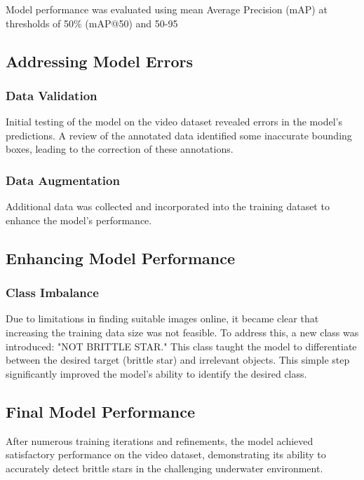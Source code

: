\documentclass{article}
\begin{document}
Model performance was evaluated using mean Average Precision (mAP) at thresholds of 50\% (mAP@50) and 50-95%

\subsection{Addressing Model Errors}

\subsubsection{Data Validation}

Initial testing of the model on the video dataset revealed errors in the model's predictions. A review of the annotated data identified some inaccurate bounding boxes, leading to the correction of these annotations.

\subsubsection{Data Augmentation}

Additional data was collected and incorporated into the training dataset to enhance the model's performance.

\subsection{Enhancing Model Performance}

\subsubsection{Class Imbalance}

Due to limitations in finding suitable images online, it became clear that increasing the training data size was not feasible. To address this, a new class was introduced: "NOT BRITTLE STAR." This class taught the model to differentiate between the desired target (brittle star) and irrelevant objects. This simple step significantly improved the model's ability to identify the desired class.

\subsection{Final Model Performance}

After numerous training iterations and refinements, the model achieved satisfactory performance on the video dataset, demonstrating its ability to accurately detect brittle stars in the challenging underwater environment.
\end{document}
